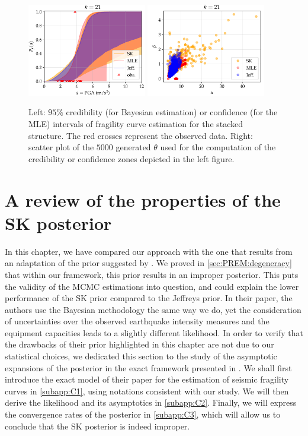 \begin{figure}[!h]
    \centering
    \includegraphics[width=5.2cm]{figures/PREM/EDEN/PGA21.pdf}\hspace*{0.5cm}
    \includegraphics[width=5.2cm]{figures/PREM/EDEN/PGA21scatter.pdf}
    \caption{Left: $95\%$ credibility (for Bayesian estimation) or confidence (for the MLE) intervals of fragility curve estimation for the stacked structure. The red crosses represent the observed data. Right: scatter plot of the $5000$ generated $\theta$ used for the computation of the credibility or confidence zones depicted in the left figure.}
    \label{fig:PREM:eden-results}
\end{figure}


\section{A review of the properties of the SK posterior}\label{app:SKreview}



In this chapter, we have compared our approach with the one that results from an adaptation of the prior suggested by \citet{straub_improved_2008}. We proved in \cref{sec:PREM:degeneracy} that within our framework, this prior results in an improper posterior. This puts the validity of the MCMC estimations into question, and could explain the lower performance of the SK prior compared to the Jeffreys prior. 
In their paper, the authors use the Bayesian methodology the same way we do, yet the consideration of uncertainties over the observed earthquake intensity measures and the equipment capacities leads to a slightly different likelihood.
In order to verify that the drawbacks of their prior highlighted in this chapter are not due to our statistical choices, we dedicated this section to the study of the asymptotic expansions of the posterior in the exact framework presented in \cite{straub_improved_2008}.
We shall first introduce the exact model of their paper for the estimation of seismic fragility curves in \cref{subapp:C1}, using notations consistent with our study. We will then derive the likelihood and its asymptotics in \cref{subapp:C2}. Finally, we will express the convergence rates of the posterior in \cref{subapp:C3}, which will allow us to conclude that the SK posterior is indeed improper.


